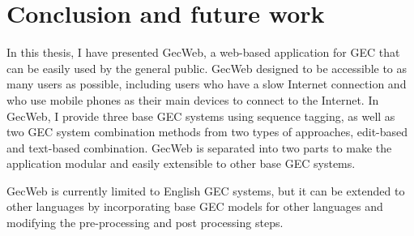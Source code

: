 \chapter{Conclusion and future work}
\label{chapter:conclusion}

In this thesis, I have presented GecWeb, a web-based application for GEC that can be easily used by the general public.
GecWeb designed to be accessible to as many users as possible, including users who have a slow Internet connection and who use mobile phones as their main devices to connect to the Internet.
In GecWeb, I provide three base GEC systems using sequence tagging, as well as two GEC system combination methods from two types of approaches, edit-based and text-based combination.
GecWeb is separated into two parts to make the application modular and easily extensible to other base GEC systems.

GecWeb is currently limited to English GEC systems, but it can be extended to other languages by incorporating base GEC models for other languages and modifying the pre-processing and post processing steps.
